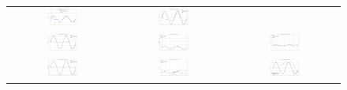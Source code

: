 \documentclass[12pt]{article}
\begin{document}
\begin{figure}[p]
\begin{tabular}{ccc}
    \includegraphics[width=0.3\textwidth]{figures/plot_18.png} &
    \includegraphics[width=0.3\textwidth]{figures/plot_19.png} \\
    \includegraphics[width=0.3\textwidth]{figures/plot_20.png} &
    \includegraphics[width=0.3\textwidth]{figures/plot_21.png} &
    \includegraphics[width=0.3\textwidth]{figures/plot_22.png} \\
    \includegraphics[width=0.3\textwidth]{figures/plot_23.png} &
    \includegraphics[width=0.3\textwidth]{figures/plot_24.png} &
    \includegraphics[width=0.3\textwidth]{figures/plot_25.png} \\
  \end{tabular}
\end{figure}
\end{document}
